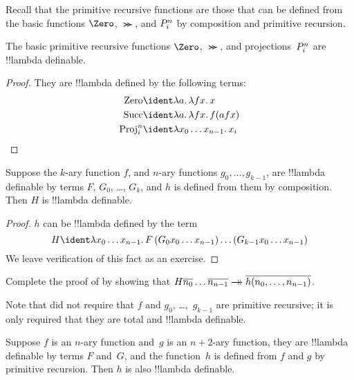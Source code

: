 \documentclass[../../../include/open-logic-section]{subfiles}
\begin{document}

Recall that the primitive recursive functions are those that can be
defined from the basic functions $\Zero$, $\Succ$, and $P^{n}_{i}$
by composition and primitive recursion.

\begin{lem}
  The basic primitive recursive functions $\Zero$, $\Succ$, and
  projections~$P^{n}_{i}$ are !!{lambda definable}.
\end{lem}

\begin{proof}
They are !!{lambda define}d by the following terms:
\begin{align*}
  \fn{Zero} & \ident \lambd[a][\lambd[fx][x]]\\
  \fn{Succ} & \ident \lambd[a][\lambd[fx][f (a f x)]] \\
  \fn{Proj}^n_i & \ident \lambd[x_0\dots x_{n-1}][x_i]
\end{align*}
\end{proof}

\begin{lem}
   Suppose the $k$-ary function $f$, and $n$-ary
  functions $g_0, \dots, g_{k-1}$, are !!{lambda definable} by terms
  $F$, $G_0$, \dots, $G_k$, and $h$ is defined from them by composition.
  Then $H$ is !!{lambda definable}.
\end{lem}

\begin{proof}
  $h$ can be !!{lambda define}d by the term
  \[
  H \ident \lambd[x_0 \dots x_{n-1}][F\, (G_0 x_0 \dots
    x_{n-1}) \dots (G_{k-1} x_0 \dots x_{n-1})]
  \]
  We leave verification of this fact as an exercise.
\end{proof}

\begin{prob}
  Complete the proof of  by showing
  that $H\num{n_0}\dots\num{n_{n-1}} \red \num{h(n_0, \dots,
    n_{n-1})}$.
\end{prob}

Note that  did not require that $f$ and $g_0$,
\dots,~$g_{k-1}$ are primitive recursive; it is only required that
they are total and !!{lambda definable}.

\begin{lem}
  Suppose $f$ is an $n$-ary function and~$g$ is an $n+2$-ary function,
  they are !!{lambda definable} by terms $F$ and~$G$, and the
  function~$h$ is defined from $f$ and $g$ by primitive
  recursion. Then $h$ is also !!{lambda definable}.
\end{lem}
\end{document}
